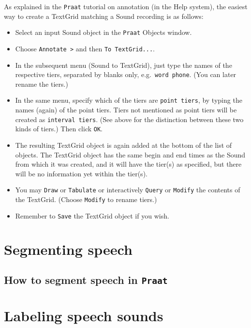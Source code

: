 \documentclass[
]{book}
\begin{document}
As explained in the \texttt{Praat} tutorial on annotation (in the Help system), the easiest way to create a TextGrid matching a Sound recording is as follows:

\begin{itemize}
\item
  Select an input Sound object in the \texttt{Praat} Objects window.
\item
  Choose \texttt{Annotate\ \textgreater{}} and then \texttt{To\ TextGrid...}.
\item
  In the subsequent menu (Sound to TextGrid), just type the names of the respective tiers, separated by blanks only, e.g.~\texttt{word\ phone}. (You can later rename the tiers.)
\item
  In the same menu, specify which of the tiers are \texttt{point\ tiers}, by typing the names (again) of the point tiers. Tiers not mentioned as point tiers will be created as \texttt{interval\ tiers}. (See above for the distinction between these two kinds of tiers.) Then click \texttt{OK}.
\item
  The resulting TextGrid object is again added at the bottom of the list of objects. The TextGrid object has the same begin and end times as the Sound from which it was created, and it will have the tier(s) as specified, but there will be no information yet within the tier(s).
\item
  You may \texttt{Draw} or \texttt{Tabulate} or interactively \texttt{Query} or \texttt{Modify} the contents of the TextGrid. (Choose \texttt{Modify} to rename tiers.)
\item
  Remember to \texttt{Save} the TextGrid object if you wish.
\end{itemize}

\section{Segmenting speech}\label{segmenting-speech}

\subsection{\texorpdfstring{How to segment speech in \texttt{Praat}}{How to segment speech in Praat}}\label{how-to-segment-speech-in-praat}

\section{Labeling speech sounds}\label{labeling-speech-sounds}
\end{document}
